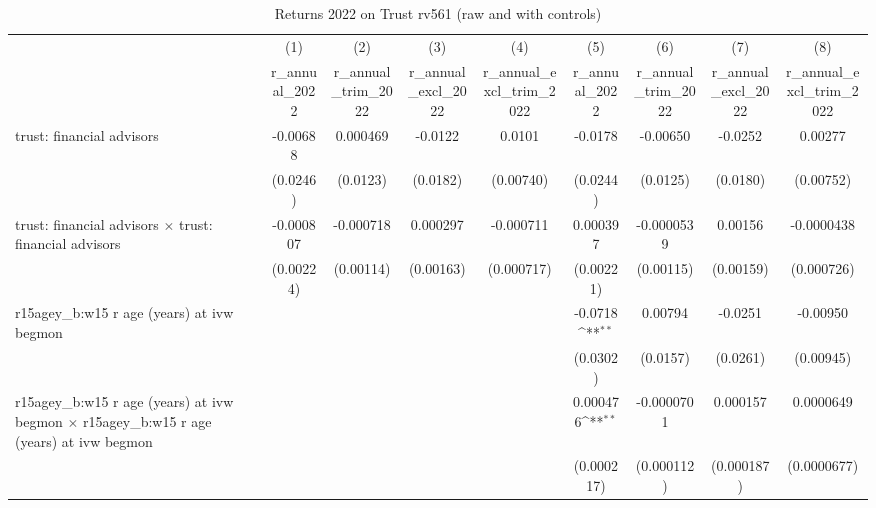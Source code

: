 \begin{table}[htbp]\centering
\def\sym#1{\ifmmode^{#1}\else\(^{#1}\)\fi}
\caption{Returns 2022 on Trust rv561 (raw and with controls)}
\begin{tabular}{l*{8}{c}}
\toprule
                &\multicolumn{1}{c}{(1)}&\multicolumn{1}{c}{(2)}&\multicolumn{1}{c}{(3)}&\multicolumn{1}{c}{(4)}&\multicolumn{1}{c}{(5)}&\multicolumn{1}{c}{(6)}&\multicolumn{1}{c}{(7)}&\multicolumn{1}{c}{(8)}\\
                &\multicolumn{1}{c}{r\_annual\_2022}&\multicolumn{1}{c}{r\_annual\_trim\_2022}&\multicolumn{1}{c}{r\_annual\_excl\_2022}&\multicolumn{1}{c}{r\_annual\_excl\_trim\_2022}&\multicolumn{1}{c}{r\_annual\_2022}&\multicolumn{1}{c}{r\_annual\_trim\_2022}&\multicolumn{1}{c}{r\_annual\_excl\_2022}&\multicolumn{1}{c}{r\_annual\_excl\_trim\_2022}\\
\midrule
trust: financial advisors& -0.00688         & 0.000469         &  -0.0122         &   0.0101         &  -0.0178         & -0.00650         &  -0.0252         &  0.00277         \\
                & (0.0246)         & (0.0123)         & (0.0182)         &(0.00740)         & (0.0244)         & (0.0125)         & (0.0180)         &(0.00752)         \\
\addlinespace
trust: financial advisors $\times$ trust: financial advisors&-0.000807         &-0.000718         & 0.000297         &-0.000711         & 0.000397         &-0.0000539         &  0.00156         &-0.0000438         \\
                &(0.00224)         &(0.00114)         &(0.00163)         &(0.000717)         &(0.00221)         &(0.00115)         &(0.00159)         &(0.000726)         \\
\addlinespace
r15agey\_b:w15 r age (years) at ivw begmon&                  &                  &                  &                  &  -0.0718\sym{**} &  0.00794         &  -0.0251         & -0.00950         \\
                &                  &                  &                  &                  & (0.0302)         & (0.0157)         & (0.0261)         &(0.00945)         \\
\addlinespace
r15agey\_b:w15 r age (years) at ivw begmon $\times$ r15agey\_b:w15 r age (years) at ivw begmon&                  &                  &                  &                  & 0.000476\sym{**} &-0.0000701         & 0.000157         &0.0000649         \\
                &                  &                  &                  &                  &(0.000217)         &(0.000112)         &(0.000187)         &(0.0000677)         \\

\end{tabular}
\end{table}
